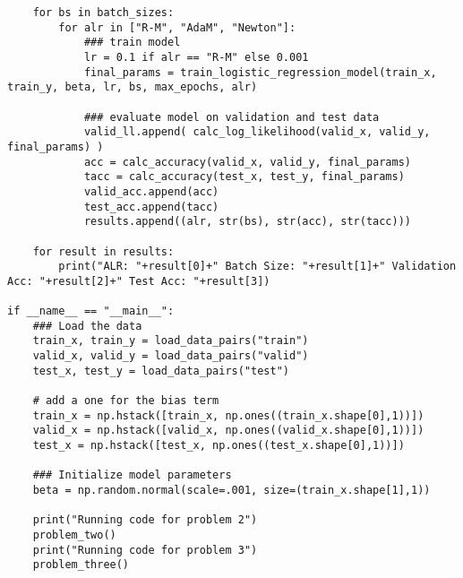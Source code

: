 \documentclass[11pt]{article}
\begin{document}
\begin{verbatim}
    for bs in batch_sizes:
        for alr in ["R-M", "AdaM", "Newton"]:
            ### train model
            lr = 0.1 if alr == "R-M" else 0.001
            final_params = train_logistic_regression_model(train_x, train_y, beta, lr, bs, max_epochs, alr)
    
            ### evaluate model on validation and test data
            valid_ll.append( calc_log_likelihood(valid_x, valid_y, final_params) )
            acc = calc_accuracy(valid_x, valid_y, final_params)
            tacc = calc_accuracy(test_x, test_y, final_params)
            valid_acc.append(acc)
            test_acc.append(tacc)
            results.append((alr, str(bs), str(acc), str(tacc)))

    for result in results:
        print("ALR: "+result[0]+" Batch Size: "+result[1]+" Validation Acc: "+result[2]+" Test Acc: "+result[3])

if __name__ == "__main__":
    ### Load the data
    train_x, train_y = load_data_pairs("train")
    valid_x, valid_y = load_data_pairs("valid")
    test_x, test_y = load_data_pairs("test")

    # add a one for the bias term                                                                                                                                                 
    train_x = np.hstack([train_x, np.ones((train_x.shape[0],1))])
    valid_x = np.hstack([valid_x, np.ones((valid_x.shape[0],1))])
    test_x = np.hstack([test_x, np.ones((test_x.shape[0],1))])

    ### Initialize model parameters
    beta = np.random.normal(scale=.001, size=(train_x.shape[1],1))

    print("Running code for problem 2")
    problem_two()
    print("Running code for problem 3")
    problem_three()
\end{verbatim}
\end{document}
